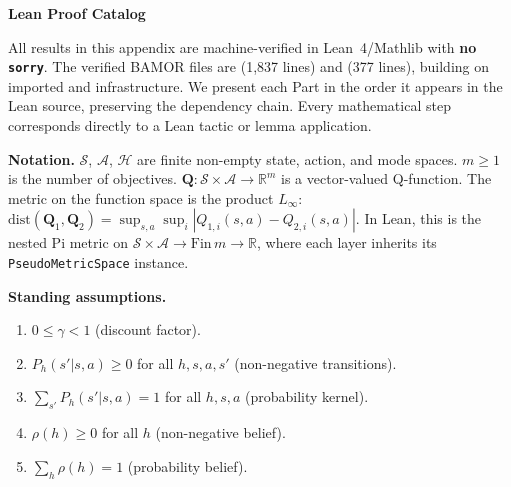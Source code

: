 \newpage
\appendix
\onecolumn

\clearpage

\clearpage

\clearpage

\clearpage
\begin{center}
    {\Large \textbf{Lean Proof Catalog}}
\end{center}
\vspace{0.5cm}

\noindent All results in this appendix are machine-verified in Lean~4/Mathlib with \textbf{no \texttt{sorry}}.  The verified BAMOR files are  (1,837 lines) and  (377 lines), building on imported  and  infrastructure.  We present each Part in the order it appears in the Lean source, preserving the dependency chain.  Every mathematical step corresponds directly to a Lean tactic or lemma application.

\medskip
\noindent\textbf{Notation.}  $\mathcal{S}$, $\mathcal{A}$, $\mathcal{H}$ are finite non-empty state, action, and mode spaces.  $m \ge 1$ is the number of objectives.  $\mathbf{Q} : \mathcal{S} \times \mathcal{A} \to \mathbb{R}^m$ is a vector-valued Q-function.  The metric on the function space is the product $L_\infty$: $\mathrm{dist}(\mathbf{Q}_1, \mathbf{Q}_2) = \sup_{s,a} \sup_i |Q_{1,i}(s,a) - Q_{2,i}(s,a)|$.  In Lean, this is the nested Pi metric on $\mathcal{S} \times \mathcal{A} \to \mathrm{Fin}\,m \to \mathbb{R}$, where each layer inherits its \texttt{PseudoMetricSpace} instance.

\medskip
\noindent\textbf{Standing assumptions.}
\begin{enumerate}
    \item[\textbf{(A0)}] $0 \le \gamma < 1$ (discount factor).
    \item[\textbf{(A1)}] $P_h(s'|s,a) \ge 0$ for all $h,s,a,s'$ (non-negative transitions).
    \item[\textbf{(A2)}] $\sum_{s'} P_h(s'|s,a) = 1$ for all $h,s,a$ (probability kernel).
    \item[\textbf{(A3)}] $\rho(h) \ge 0$ for all $h$ (non-negative belief).
    \item[\textbf{(A4)}] $\sum_h \rho(h) = 1$ (probability belief).
\end{enumerate}

